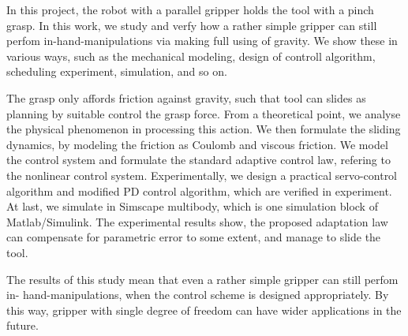 \begin{enabstract}
In this project, the robot with a parallel gripper holds the tool with a pinch grasp.
In this work, we study and verfy how a rather simple gripper can still perfom in-hand-manipulations via making full using of gravity. 
We show these in various ways, such as the mechanical modeling, 
design of controll algorithm, scheduling experiment, simulation, and so on.

The grasp only affords friction against gravity,
such that tool can slides as planning by suitable control the grasp force.
From a theoretical point, we analyse the physical phenomenon in processing this action.
We then formulate the sliding dynamics,
by modeling the friction as Coulomb and viscous friction.
We model the control system and formulate the standard adaptive control law,
refering to the nonlinear control system.
Experimentally, we design a practical servo-control algorithm and
modified PD control algorithm, which are verified in experiment.
At last, we simulate in Simscape multibody,
which is one simulation block of Matlab/Simulink.
The experimental results show, the proposed adaptation law can
compensate for parametric error to some extent, and manage to slide the tool.

The results of this study mean that even a rather simple gripper can still perfom in- hand-manipulations, 
when the control scheme is designed appropriately. 
By this way, gripper with single degree of freedom can have wider applications in the future.


\end{enabstract}
